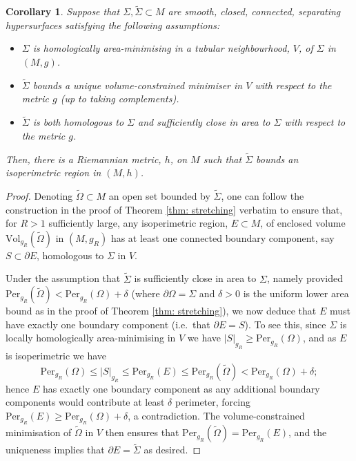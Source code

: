 \documentclass[10pt,a4paper]{amsart}
\newtheorem{corollary}{Corollary}
\begin{document}
\begin{corollary}\label{cor: stretching for vcm}  
    Suppose that $\Sigma,\widetilde{\Sigma} \subset M$ are smooth, closed, connected, separating hypersurfaces satisfying the following assumptions:
    
    \begin{itemize}
        \item $\Sigma$ is homologically area-minimising in a tubular neighbourhood, $V$, of $\Sigma$ in $(M,g)$.

        \item $\widetilde{\Sigma}$ bounds a unique volume-constrained minimiser in $V$ with respect to the metric $g$ (up to taking complements).

        \item $\widetilde{\Sigma}$ is both homologous to $\Sigma$ and sufficiently close in area to $\Sigma$ with respect to the metric $g$. 
    \end{itemize}
    Then, there is a Riemannian metric, $h$, on $M$ such that $\widetilde{\Sigma}$ bounds an isoperimetric region in $(M,h)$.
\end{corollary}

\begin{proof}
    Denoting $\widetilde{\Omega} \subset M$ an open set bounded by $\widetilde{\Sigma}$, one can follow the construction in the proof of Theorem \ref{thm: stretching} verbatim to ensure that, for $R > 1$ sufficiently large, any isoperimetric region, $E \subset M$, of enclosed volume $\mathrm{Vol}_{g_R}(\widetilde{\Omega})$ in $(M,g_R)$ has at least one connected boundary component, say $S \subset \partial E$, homologous to $\Sigma$ in $V$.
    
    \bigskip
    
    Under the assumption that $\widetilde{\Sigma}$ is sufficiently close in area to $\Sigma$, namely provided
    $\mathrm{Per}_{g_R}(\widetilde{\Omega}) < \mathrm{Per}_{g_R}(\Omega) + \delta$ (where $\partial \Omega = \Sigma$ and $\delta > 0$ is the uniform lower area bound as in the proof of Theorem \ref{thm: stretching}), we now deduce that $E$ must have exactly one boundary component (i.e.~that $\partial E = S$). To see this, since $\Sigma$ is locally homologically area-minimising in $V$ we have $|S|_{g_R} \geq \mathrm{Per}_{g_R}(\Omega)$, and as $E$ is isoperimetric we have 
    $$\mathrm{Per}_{g_R}(\Omega) \leq |S|_{g_R} \leq \mathrm{Per}_{g_R}(E) \leq \mathrm{Per}_{g_R}(\widetilde{\Omega}) < \mathrm{Per}_{g_R}(\Omega) + \delta;$$
    hence $E$ has exactly one boundary component as any additional boundary components would contribute at least $\delta$ perimeter, forcing $\mathrm{Per}_{g_R}(E) \geq \mathrm{Per}_{g_R}(\Omega) + \delta$, a contradiction. The volume-constrained minimisation of $\widetilde{\Omega}$ in $V$ then ensures that $\mathrm{Per}_{g_R}(\widetilde{\Omega}) = \mathrm{Per}_{g_R}(E)$, and the uniqueness implies that $\partial E = \widetilde{\Sigma}$ as desired.
\end{proof}
\end{document}
